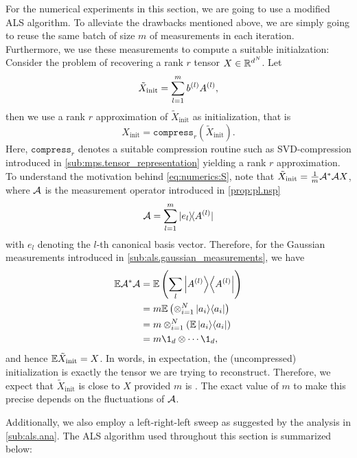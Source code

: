 For the numerical experiments in this section, we are going to use a modified ALS algorithm.
To alleviate the drawbacks mentioned above, we are simply going to reuse the same batch of size $m$ of measurements in each iteration.
Furthermore, we use these measurements to compute a suitable initialzation:
Consider the problem of recovering a rank $r$ tensor $X \in \Reals^{d^N}$.
Let
\[
  \label{eq:numerics.S}
  \tilde X_\mathrm{init} = \sum_{l=1}^m b\ind{l} A\ind{l},
\]
then we use a rank $r$ approximation of $\tilde X_\mathrm{init}$ as initialization, that is
\[
  \label{eq:numerics.Xinit}
  X_\mathrm{init} = \mathtt{compress}_r(\tilde X_\mathrm{init}).
\]
Here, $\mathtt{compress}_r$ denotes a suitable compression routine such as SVD-compression introduced in \cref{sub:mps.tensor_representation} yielding a rank $r$ approximation.
To understand the motivation behind \cref{eq:numerics:S}, note that $\tilde X_\mathrm{init} = \frac{1}{m} \adj{\AA}\AA X$, where $\AA$ is the measurement operator introduced in \cref{prop:pl.nsp}
\[
  \AA = \sum_{l=1}^m \ket{e_l}\bra{A\ind{l}}
\]
with $e_l$ denoting the $l$-th canonical basis vector.
Therefore, for the Gaussian measurements introduced in \cref{sub:als.gaussian_measurements}, we have
\begin{align}
  \Exp \adj{\AA}\AA
  &= \Exp \left( \sum_l \Ketbra{A\ind{l}} \right) \\
  &= m \Exp\left( \otimes_{i=1}^N \Ketbra{a_i} \right) \\
  &= m \otimes_{i=1}^N \left( \Exp \Ketbra{a_i} \right) \\
  &= m \1_d \otimes \cdots \1_d,
\end{align}
and hence $\Exp \tilde X_\mathrm{init} = X$.
In words, in expectation, the (uncompressed) initialization is exactly the tensor we are trying to reconstruct.
Therefore, we expect that $\tilde X_\mathrm{init}$ is close to $X$ provided $m$ is .
The exact value of $m$ to make this precise depends on the fluctuations of $\AA$.

Additionally, we also employ a left-right-left sweep as suggested by the analysis in \cref{sub:als.ana}.
The  ALS algorithm used throughout this section is summarized below:

